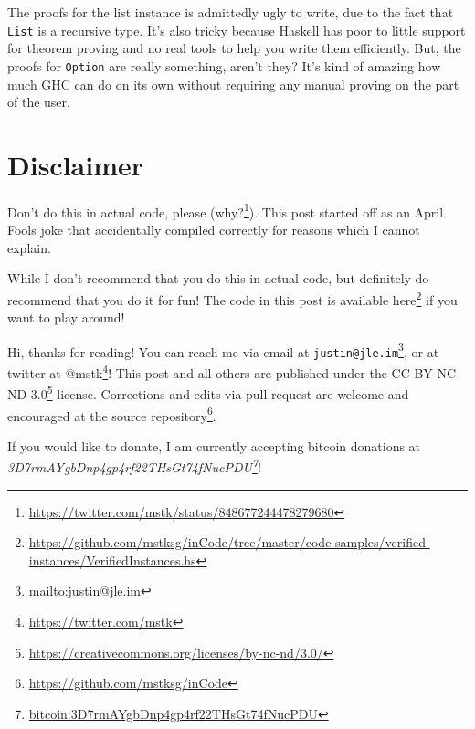 \documentclass[]{article}
\renewcommand{\href}[2]{#2\footnote{\url{#1}}}
\begin{document}
The proofs for the list instance is admittedly ugly to write, due to the fact
that \texttt{List} is a recursive type. It's also tricky because Haskell has
poor to little support for theorem proving and no real tools to help you write
them efficiently. But, the proofs for \texttt{Option} are really something,
aren't they? It's kind of amazing how much GHC can do on its own without
requiring any manual proving on the part of the user.

\hypertarget{disclaimer}{%
\section{Disclaimer}\label{disclaimer}}

Don't do this in actual code, please
(\href{https://twitter.com/mstk/status/848677244478279680}{why?}). This post
started off as an April Fools joke that accidentally compiled correctly for
reasons which I cannot explain.

While I don't recommend that you do this in actual code, but definitely do
recommend that you do it for fun! The code in this post is available
\href{https://github.com/mstksg/inCode/tree/master/code-samples/verified-instances/VerifiedInstances.hs}{here}
if you want to play around!

Hi, thanks for reading! You can reach me via email at
\href{mailto:justin@jle.im}{\nolinkurl{justin@jle.im}}, or at twitter at
\href{https://twitter.com/mstk}{@mstk}! This post and all others are published
under the \href{https://creativecommons.org/licenses/by-nc-nd/3.0/}{CC-BY-NC-ND
3.0} license. Corrections and edits via pull request are welcome and encouraged
at \href{https://github.com/mstksg/inCode}{the source repository}.

If you would like to donate, I am currently accepting bitcoin donations at
\emph{\href{bitcoin:3D7rmAYgbDnp4gp4rf22THsGt74fNucPDU}{3D7rmAYgbDnp4gp4rf22THsGt74fNucPDU}}!
\end{document}
